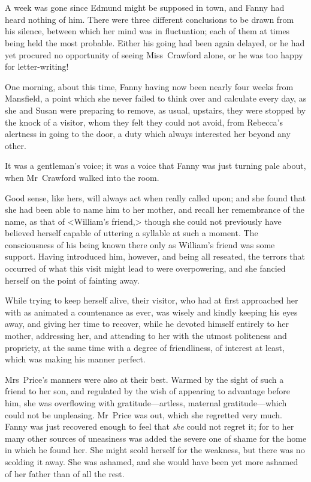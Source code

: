 \chapter[Chapter \thechapter]{} 
	
\lettrine[lraise=0.3]{A}{} week was gone since Edmund might be supposed in town, and Fanny had heard nothing of him. There were three different conclusions to be drawn from his silence, between which her mind was in fluctuation; each of them at times being held the most probable. Either his going had been again delayed, or he had yet procured no opportunity of seeing Miss~Crawford alone, or he was too happy for letter-writing!

One morning, about this time, Fanny having now been nearly four weeks from Mansfield, a point which she never failed to think over and calculate every day, as she and Susan were preparing to remove, as usual, upstairs, they were stopped by the knock of a visitor, whom they felt they could not avoid, from Rebecca's alertness in going to the door, a duty which always interested her beyond any other.

It was a gentleman's voice; it was a voice that Fanny was just turning pale about, when Mr~Crawford walked into the room.

Good sense, like hers, will always act when really called upon; and she found that she had been able to name him to her mother, and recall her remembrance of the name, as that of <William's friend,> though she could not previously have believed herself capable of uttering a syllable at such a moment. The consciousness of his being known there only as William's friend was some support. Having introduced him, however, and being all reseated, the terrors that occurred of what this visit might lead to were overpowering, and she fancied herself on the point of fainting away.

While trying to keep herself alive, their visitor, who had at first approached her with as animated a countenance as ever, was wisely and kindly keeping his eyes away, and giving her time to recover, while he devoted himself entirely to her mother, addressing her, and attending to her with the utmost politeness and propriety, at the same time with a degree of friendliness, of interest at least, which was making his manner perfect.

Mrs~Price's manners were also at their best. Warmed by the sight of such a friend to her son, and regulated by the wish of appearing to advantage before him, she was overflowing with gratitude—artless, maternal gratitude—which could not be unpleasing. Mr~Price was out, which she regretted very much. Fanny was just recovered enough to feel that \textit{she}  could not regret it; for to her many other sources of uneasiness was added the severe one of shame for the home in which he found her. She might scold herself for the weakness, but there was no scolding it away. She was ashamed, and she would have been yet more ashamed of her father than of all the rest.

